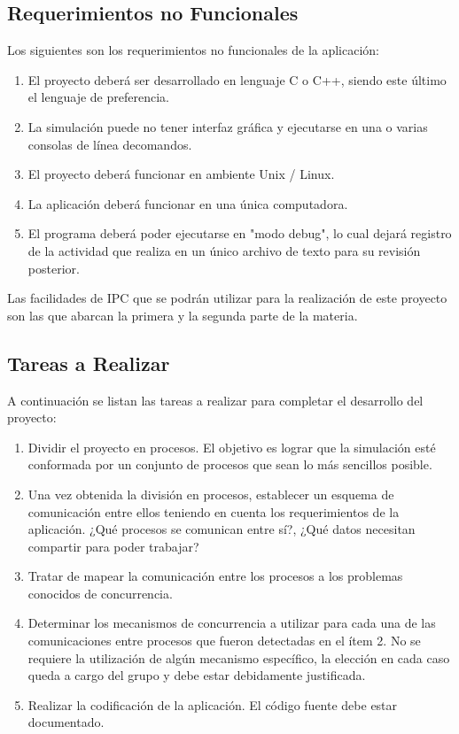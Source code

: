 \documentclass[12pt,a4paper,titlepage,oneside]{article}
\begin{document}
 
\subsection{Requerimientos no Funcionales}

Los siguientes son los requerimientos no funcionales de la aplicación:

\begin{enumerate}
 \item
  El proyecto deberá ser desarrollado en lenguaje C o C++, siendo este último el  lenguaje de preferencia.
  \item
  La simulación puede no tener interfaz gráfica y ejecutarse en una o varias consolas de línea decomandos.
  \item
  El proyecto deberá funcionar en ambiente Unix / Linux.
  \item
La aplicación deberá funcionar en una única computadora.  
\item
El programa deberá poder ejecutarse en "modo debug", lo cual dejará registro de la actividad que realiza en un único archivo de texto para su revisión posterior.
\end{enumerate} 


Las facilidades de IPC que se podrán utilizar para la realización de este proyecto son las que abarcan la primera y la segunda parte de la materia.

\subsection{Tareas a Realizar}

A continuación se listan las tareas a realizar para completar el desarrollo del proyecto:

\begin{enumerate}
\item
 Dividir el proyecto en procesos. El objetivo es lograr que la simulación esté conformada por un conjunto de procesos que sean lo más sencillos posible.
\item
Una vez obtenida la división en procesos, establecer un esquema de comunicación entre ellos teniendo en cuenta los requerimientos de la aplicación. ¿Qué procesos se comunican entre sí?, ¿Qué datos necesitan compartir para poder trabajar?
\item
Tratar de mapear la comunicación entre los procesos a los problemas conocidos de concurrencia.
\item 
Determinar los mecanismos de concurrencia a utilizar para cada una de las comunicaciones entre procesos que fueron detectadas en el ítem 2. No se requiere la utilización de algún mecanismo específico, la elección en cada caso queda a cargo del grupo y debe estar debidamente justificada.
\item
 Realizar la codificación de la aplicación. El código fuente debe estar documentado.
\end{enumerate}
 
\end{document}
